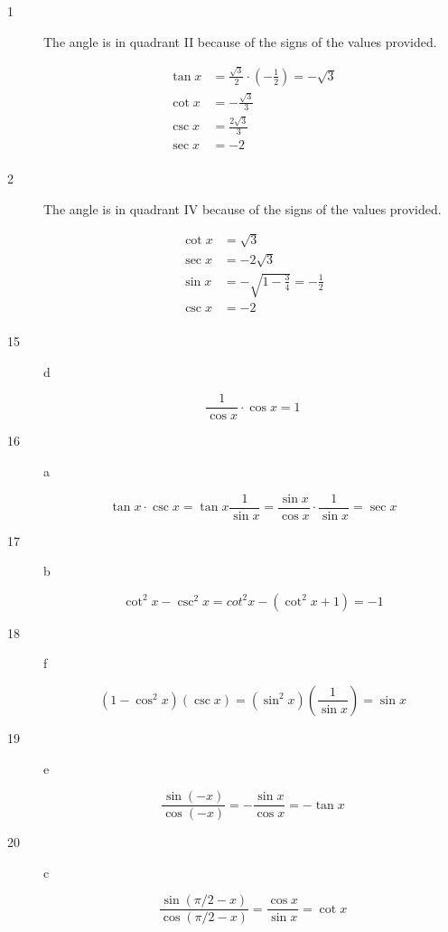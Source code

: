 \documentclass[fleqn,addpoints]{exam}
\begin{document}
\begin{description}

\item[1] 
The angle is in quadrant II because of the signs of the values provided.

\begin{align*}
  \tan x &= \frac{\sqrt{3}}{2} \cdot \left( - \frac{1}{2} \right) = - \sqrt{3} \\
  \cot x &= -\frac{\sqrt{3}}{3} \\ 
  \csc x &= \frac{2 \sqrt{3}}{3} \\
  \sec x &= -2 \\
\end{align*}

\item[2] 
The angle is in quadrant IV because of the signs of the values provided.

\begin{align*}
  \cot x &= \sqrt{3} \\
  \sec x &= -2 \sqrt{3} \\
  \sin x &= - \sqrt{1 - \frac{3}{4}} = -\frac{1}{2} \\
  \csc x &= -2 \\
\end{align*}

\item[15]
d

\[
  \frac{1}{\cos x} \cdot \cos x = 1
\]

\item[16]
a

\[
  \tan x \cdot \csc x = \tan x \frac{1}{\sin x} = \frac{\sin x}{\cos x} \cdot \frac{1}{\sin x} = \sec x
\]

\item[17]
b

\[
  \cot^2 x - \csc^2 x = cot^2 x - (\cot^2 x + 1) = -1
\]

\item[18]
f

\[
  (1 - \cos^2 x)(\csc x) =   (\sin^2 x) \left( \frac{1}{\sin x} \right) = \sin x
\]

\item[19]
e

\[
  \frac{\sin (-x)}{\cos (-x)} = - \frac{\sin x}{\cos x} = - \tan x
\]

\item[20]
c

\[
  \frac{\sin (\pi/2 - x)}{\cos (\pi/2 -x)} = \frac{\cos x}{\sin x} = \cot x
\]


\end{description}
\end{document}
